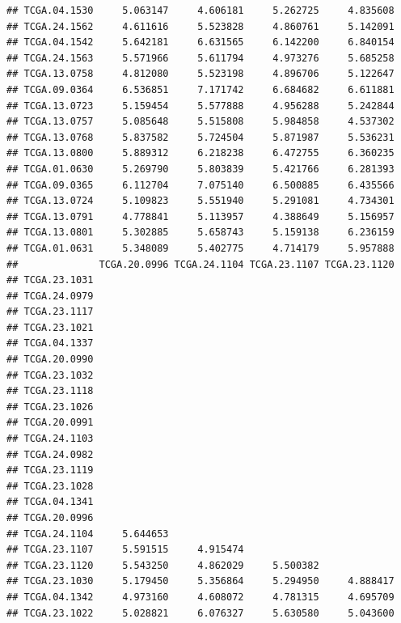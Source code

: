 \documentclass[UTF8]{beamer}\usepackage[]{graphicx}\usepackage[]{color}
\makeatletter
\newenvironment{kframe}{%
 \def\at@end@of@kframe{}%
 \ifinner\ifhmode%
  \def\at@end@of@kframe{\end{minipage}}%
  \begin{minipage}{\columnwidth}%
 \fi\fi%
 \def\FrameCommand##1{\hskip\@totalleftmargin \hskip-\fboxsep
 \colorbox{shadecolor}{##1}\hskip-\fboxsep
     \hskip-\linewidth \hskip-\@totalleftmargin \hskip\columnwidth}%
 \MakeFramed {\advance\hsize-\width
   \@totalleftmargin\z@ \linewidth\hsize
   \@setminipage}}%
 {\par\unskip\endMakeFramed%
 \at@end@of@kframe}
\newenvironment{knitrout}{}{} %
\makeatother
\begin{document}
\begin{frame}[fragile]
\begin{knitrout}
\begin{kframe}
\begin{verbatim}
## TCGA.04.1530     5.063147     4.606181     5.262725     4.835608
## TCGA.24.1562     4.611616     5.523828     4.860761     5.142091
## TCGA.04.1542     5.642181     6.631565     6.142200     6.840154
## TCGA.24.1563     5.571966     5.611794     4.973276     5.685258
## TCGA.13.0758     4.812080     5.523198     4.896706     5.122647
## TCGA.09.0364     6.536851     7.171742     6.684682     6.611881
## TCGA.13.0723     5.159454     5.577888     4.956288     5.242844
## TCGA.13.0757     5.085648     5.515808     5.984858     4.537302
## TCGA.13.0768     5.837582     5.724504     5.871987     5.536231
## TCGA.13.0800     5.889312     6.218238     6.472755     6.360235
## TCGA.01.0630     5.269790     5.803839     5.421766     6.281393
## TCGA.09.0365     6.112704     7.075140     6.500885     6.435566
## TCGA.13.0724     5.109823     5.551940     5.291081     4.734301
## TCGA.13.0791     4.778841     5.113957     4.388649     5.156957
## TCGA.13.0801     5.302885     5.658743     5.159138     6.236159
## TCGA.01.0631     5.348089     5.402775     4.714179     5.957888
##              TCGA.20.0996 TCGA.24.1104 TCGA.23.1107 TCGA.23.1120
## TCGA.23.1031                                                    
## TCGA.24.0979                                                    
## TCGA.23.1117                                                    
## TCGA.23.1021                                                    
## TCGA.04.1337                                                    
## TCGA.20.0990                                                    
## TCGA.23.1032                                                    
## TCGA.23.1118                                                    
## TCGA.23.1026                                                    
## TCGA.20.0991                                                    
## TCGA.24.1103                                                    
## TCGA.24.0982                                                    
## TCGA.23.1119                                                    
## TCGA.23.1028                                                    
## TCGA.04.1341                                                    
## TCGA.20.0996                                                    
## TCGA.24.1104     5.644653                                       
## TCGA.23.1107     5.591515     4.915474                          
## TCGA.23.1120     5.543250     4.862029     5.500382             
## TCGA.23.1030     5.179450     5.356864     5.294950     4.888417
## TCGA.04.1342     4.973160     4.608072     4.781315     4.695709
## TCGA.23.1022     5.028821     6.076327     5.630580     5.043600

\end{verbatim}
\end{kframe}
\end{knitrout}
\end{frame}
\end{document}
